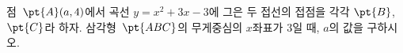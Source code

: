 점~$\pt{A}(a{,}\mkern3mu\mathopen{}4)$에서 곡선 $y=x^2+3x-3$에 그은 두 접선의 접점을 각각 $\pt{B}$, $\pt{C}$라 하자. 삼각형~$\pt{ABC}$의 무게중심의 $x$좌표가 $3$일 때, $a$의 값을 구하시오.
